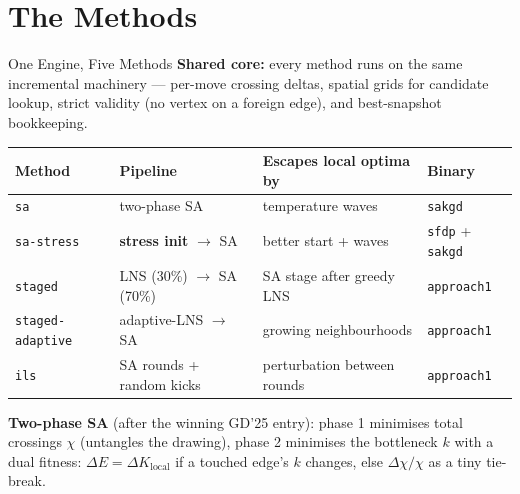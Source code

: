 \section{The Methods}

\begin{frame}{One Engine, Five Methods}
  \textbf{Shared core:} every method runs on the same incremental machinery ---
  per-move crossing deltas, spatial grids for candidate lookup, strict validity
  (no vertex on a foreign edge), and best-snapshot bookkeeping.
  \medskip
  \begin{center}
    \footnotesize
    \begin{tabular}{llll}
      \toprule
      \textbf{Method} & \textbf{Pipeline} & \textbf{Escapes local optima by} & \textbf{Binary} \\
      \midrule
      \texttt{sa}        & two-phase SA                    & temperature waves            & \texttt{sakgd} \\
      \texttt{sa-stress} & \textbf{stress init} $\to$ SA   & better start + waves         & \texttt{sfdp} + \texttt{sakgd} \\
      \texttt{staged}    & LNS (30\%) $\to$ SA (70\%)      & SA stage after greedy LNS    & \texttt{approach1} \\
      \texttt{staged-adaptive} & adaptive-LNS $\to$ SA     & growing neighbourhoods       & \texttt{approach1} \\
      \texttt{ils}       & SA rounds + random kicks        & perturbation between rounds  & \texttt{approach1} \\
      \bottomrule
    \end{tabular}
  \end{center}
  \medskip
  \textbf{Two-phase SA} (after the winning GD'25 entry):
  phase 1 minimises total crossings $\chi$ (untangles the drawing),
  phase 2 minimises the bottleneck $k$ with a dual fitness:
  $\Delta E = \Delta K_{\text{local}}$ if a touched edge's $k$ changes,
  else $\Delta\chi/\chi$ as a tiny tie-break.
\end{frame}

